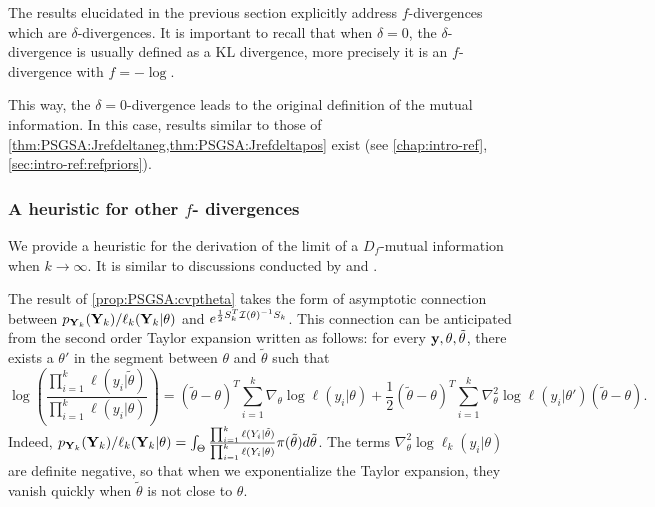         The results elucidated in the previous section %
        explicitly address $f$-divergences which are $\delta$-divergences.
        It is important to recall that when $\delta=0$, the $\delta$-divergence is usually defined as a  $\text{KL}$ divergence, more precisely it is an $f$-divergence with $f=-\log$.

        This way, the $\delta=0$-divergence leads to the original definition of the mutual information.
        In this case, 
        results similar to those of \cref{thm:PSGSA:Jrefdeltaneg,thm:PSGSA:Jrefdeltapos} exist (see \cref{chap:intro-ref}, \cref{sec:intro-ref:refpriors}). 
        



        \subsubsection{A heuristic for other $f$- divergences}

        We provide a heuristic for the derivation of the limit of a $D_f$-mutual information when $k\to\infty$. It is similar to discussions conducted by \citet{mure_objective_2018} and \citet{xie_minimax_1997}.

        The result of \cref{prop:PSGSA:cvptheta} takes the form of asymptotic connection between $p_{\mathbf{Y}_k}(\mathbf{Y}_k)/\ell_k(\mathbf{Y}_k|\theta) $ and $e^{\frac{1}{2}S_k^T\mathcal{I}(\theta)^{-1}S_k}$. This connection can be anticipated from the second order Taylor expansion written as follows: for every $\mathbf{y},\theta, \tilde\theta$, there exists a $\theta'$ in the segment between $\theta$ and $\tilde\theta$ such that
        \begin{equation}
            \log\left(\frac{\prod_{i=1}^k \ell(y_i|\tilde\theta)}{\prod_{i=1}^k \ell(y_i|\theta)}\right) = (\tilde\theta-\theta)^T\sum_{i=1}^k\nabla_\theta\log \ell(y_i|\theta) +\frac{1}{2}(\tilde\theta-\theta)^T\sum_{i=1}^k\nabla_\theta^2\log \ell(y_i|\theta')(\tilde\theta-\theta).
        \end{equation}
        Indeed, $p_{\mathbf{Y}_k}(\mathbf{Y}_k)/\ell_k(\mathbf{Y}_k|\theta) = \int_\Theta \frac{\prod_{i=1}^k \ell(Y_i|\tilde\theta)}{\prod_{i=1}^k \ell(Y_i|\theta)} \pi(\tilde\theta)d\tilde\theta$.
        The terms $\nabla_\theta^2\log\ell_k(y_i|\theta)$ are definite negative, so that when we exponentialize the Taylor expansion, they vanish quickly when $\tilde\theta$ is not close to $\theta$.
        
